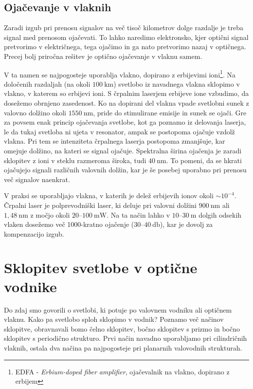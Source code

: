 \subsection*{Ojačevanje v vlaknih}
Zaradi izgub pri prenosu signalov na več tisoč kilometrov dolge razdalje 
je treba signal med prenosom ojačevati. To lahko naredimo elektronsko, kjer optični signal 
pretvorimo v električnega, tega ojačimo in ga nato pretvorimo nazaj v optičnega. 
Precej bolj priročna rešitev je optično ojačevanje v vlaknu samem. 

V ta namen se najpogosteje uporablja vlakno, dopirano z erbijevimi 
ioni\footnote{EDFA - {\it Erbium-doped fiber amplifier}, 
ojačevalnik na vlakno, dopirano z erbijem}. 
Na določenih razdaljah (na okoli $100~\si{\kilo\meter}$) svetlobo iz navadnega vlakna 
sklopimo v vlakno, v katerem so erbijevi ioni.
S črpalnim laserjem erbijeve ione vzbudimo, da dosežemo obrnjeno zasedenost. 
Ko na dopirani del vlakna vpade svetlobni sunek z valovno dolžino okoli 
$1550~\si{\nano\meter}$, pride do stimulirane emisije in 
sunek se ojači. Gre za povsem enak princip ojačevanja svetlobe, kot ga poznamo iz 
delovanja laserja, le da tukaj svetloba ni ujeta v resonator, ampak se postopoma 
ojačuje vzdolž vlakna. Pri tem se intenziteta črpalnega laserja postopoma zmanjšuje,
kar omejuje dolžino, na kateri se signal ojačuje.
Spektralna širina ojačenja je zaradi sklopitev z ioni v steklu 
razmeroma široka, tudi $40~\si{\nano\meter}$. To pomeni, da se hkrati ojačujejo signali različnih 
valovnih dolžin, kar je še posebej uporabno pri prenosu več signalov naenkrat.

V praksi se uporabljajo vlakna, v katerih je delež erbijevih ionov okoli $\sim 10^{-4}$. 
Črpalni laser je polprevodniški laser, ki 
deluje pri valovni dolžini $900~\si{\nano\meter}$ ali $1,48~\si{\nano\meter}$ 
z močjo okoli $20$--$100~\si{\milli\watt}$. Na ta način lahko v $10$--$30~\si{\meter}$
dolgih odsekih vlaken dosežemo več 1000-kratno ojačenje ($30$--$40~\si{\decibel}$), kar 
je dovolj za kompenzacijo izgub.

\section{Sklopitev svetlobe v optične vodnike}
Do zdaj smo govorili o svetlobi, ki potuje po valovnem vodniku ali optičnem vlaknu. Kako pa 
svetlobo sploh sklopimo v vodnik? Poznamo več načinov sklopitve, obravnavali bomo 
čelno sklopitev, bočno sklopitev s prizmo in bočno sklopitev s periodično strukturo.
Prvi način navadno uporabljamo pri 
cilindričnih vlaknih, ostala dva načina pa najpogosteje pri planarnih valovodnih strukturah.

